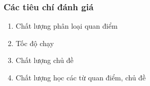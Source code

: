 \documentclass{beamer}
\begin{document}
\begin{frame}
\frametitle{Các tiêu chí đánh giá}
\begin{enumerate}
\item Chất lượng phân loại quan điểm
\item Tốc độ chạy
\item Chất lượng chủ đề
\item Chất lượng học các từ quan điểm, chủ đề
\end{enumerate}
\end{frame}

\end{document}
